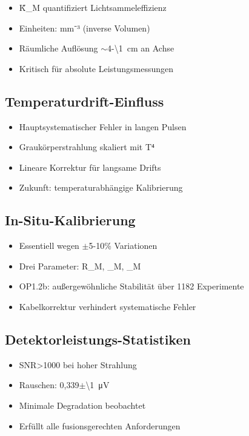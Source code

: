 \documentclass[11pt,a4paper]{article}
\begin{document}
\begin{itemize}
\item K̃_M quantifiziert Lichtsammeleffizienz
\item Einheiten: mm⁻³ (inverse Volumen)
\item Räumliche Auflösung $\sim$4-\SI{\1}{cm} an Achse
\item Kritisch für absolute Leistungsmessungen
\end{itemize}

\subsection{Temperaturdrift-Einfluss}

\begin{itemize}
\item Hauptsystematischer Fehler in langen Pulsen
\item Graukörperstrahlung skaliert mit T⁴
\item Lineare Korrektur für langsame Drifts
\item Zukunft: temperaturabhängige Kalibrierung
\end{itemize}

\subsection{In-Situ-Kalibrierung}

\begin{itemize}
\item Essentiell wegen $\pm$5-10\% Variationen
\item Drei Parameter: R_M, \tau_M, \kappa_M
\item OP1.2b: außergewöhnliche Stabilität über 1182 Experimente
\item Kabelkorrektur verhindert systematische Fehler
\end{itemize}

\subsection{Detektorleistungs-Statistiken}

\begin{itemize}
\item SNR>1000 bei hoher Strahlung
\item Rauschen: 0,339$\pm$\SI{\1}{\micro V}
\item Minimale Degradation beobachtet
\item Erfüllt alle fusionsgerechten Anforderungen
\end{itemize}
\end{document}
